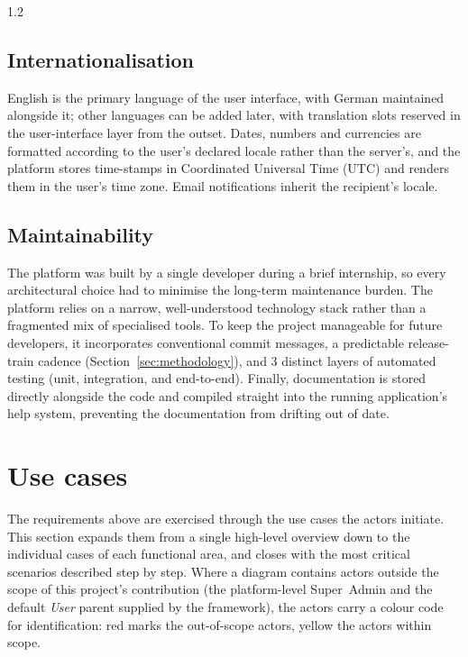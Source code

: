 \begin{spacing}{1.2}
\subsection{Internationalisation}
\label{sec:nfr-i18n}
English is the primary language of the user interface, with German
maintained alongside it; other languages can be added later, with
translation slots reserved in the user-interface
layer from the outset. Dates, numbers and currencies are formatted
according to the user's declared locale rather than the server's,
and the platform stores time-stamps in Coordinated Universal Time (UTC)
and renders them in the user's time zone. Email notifications inherit
the recipient's locale.

\subsection{Maintainability}
The platform was built by a single developer during a brief internship, so
every architectural choice had to minimise the long-term maintenance burden.
The platform relies on a narrow, well-understood technology
stack rather than a fragmented mix of specialised tools.
To keep the project manageable for future developers, it incorporates
conventional commit messages, a predictable release-train cadence
(Section~\ref{sec:methodology}), and 3 distinct layers of automated
testing (unit, integration, and end-to-end). Finally, documentation is stored
directly alongside the code and compiled straight into the running application's
help system, preventing the documentation from drifting out of date.

\section{Use cases}
\label{sec:usecases}

The requirements above are exercised through the use cases the actors
initiate. This section expands them from a single high-level overview
down to the individual cases of each functional area, and closes with
the most critical scenarios described step by step. Where a diagram
contains actors outside the scope of this project's contribution (the
platform-level Super~Admin and the default \emph{User} parent supplied
by the framework), the actors carry a colour code for identification:
red marks the out-of-scope actors, yellow the actors within scope.


\end{spacing}
